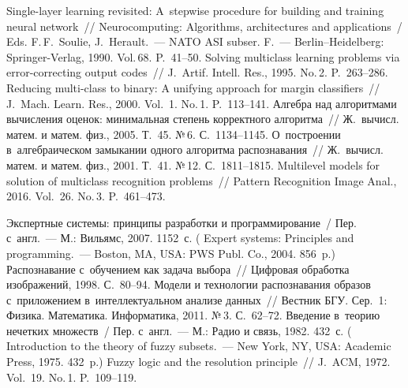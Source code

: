 \begin{multicols}{2}
{{\begin{thebibliography}{99}
{ Single-layer learning revisited: A~stepwise procedure for building and training neural network}~//
    Neurocomputing: Algorithms, architectures and applications~/
    Eds. F.\,F.~Soulie, J.~Herault.~--- NATO ASI subser. F.~---  Berlin--Heidelberg:
    Springer-Verlag, 1990. Vol.\,68. 
    P.~41--50.
{Solving multiclass learning problems via error-correcting output codes}~//
    J.~Artif. Intell. Res., 1995. No.\,2. P.~263--286.
{Reducing multi-class to binary: A unifying approach for margin classifiers}~//
    J.~Mach. Learn. Res., 2000. Vol.~1. No.\,1. P.~113--141.
    {Алгебра над алгоритмами вычисления оценок: минимальная степень корректного алгоритма}~//
    Ж.~вычисл. матем. и матем. физ.,  2005. Т.~45. №\,6. С.~1134--1145.
{О~построении в~алгебраическом замыкании одного алгоритма распознавания}~//
    Ж.~вычисл. матем. и матем. физ., 2001. Т.~41. №\,12. С.~1811--1815.
{Multilevel models for solution of multiclass recognition problems}~//
    Pattern Recognition Image Anal., 2016. Vol.~26. No.\,3. P.~461--473.

Экспертные системы: принципы разработки и программирование~/
Пер. с~англ.~--- М.: Вильямс, 2007. 
1152~с. ( {Expert systems: 
Principles and programming}.~---  Boston, MA, USA: PWS Publ. Co., 2004. 856~p.)
{Распознавание с~обучением как задача выбора}~//
    Цифровая обработка изображений, 1998. С.~80--94.
{Модели и технологии распознавания образов с~приложением в~интеллектуальном анализе данных}~//
    Вестник БГУ. Сер.~1: Физика. Математика. Информатика, 2011. №\,3. С.~62--72.
Введение в~теорию нечетких множеств~/
Пер. с~англ.~--- М.: Радио и связь, 1982. 432~с.
( {Introduction to the theory of fuzzy subsets.}~---
New York, NY, USA: Academic Press, 1975.
432~p.)
{Fuzzy logic and the resolution principle}~//
    J.~ACM, 1972. Vol.~19. No.\,1. P.~109--119.




\end{thebibliography}}}
\end{multicols}
